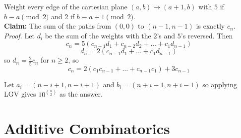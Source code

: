 \documentclass[11pt]{scrartcl}
\theoremstyle{plain} %
\theoremstyle{definition}
\theoremstyle{remark}
\theoremstyle{empty}
\theoremstyle{empty}
\theoremstyle{empty}
\theoremstyle{empty}
\theoremstyle{empty}
\theoremstyle{empty}
\theoremstyle{empty}
\theoremstyle{empty}
\begin{document}
\begin{solution}[Solution 1]
  Weight every edge of the cartesian plane $(a,b) \to (a+1, b)$ with $5$ if $b \equiv a\pmod 2$ and $2$ if $b \equiv a+1 \pmod 2$. 
  \\
  \textbf{Claim: }The sum of the paths from $(0,0)$ to $(n-1, n-1)$ is exactly $c_n$. 
  \\ \textit{Proof. }Let $d_i$ be the sum of the weights with the $2$'s and $5$'s reversed. Then \[c_n = 5(c_{n-1}d_1 + c_{n-2}d_2 + \ldots + c_{1}d_{n-1})\] \[d_n = 2(c_{n-1}d_1 + \ldots + c_1d_{n-1})\] so $d_n = \frac{2}{5}c_n$ for $n\ge 2$, so \[c_n = 2(c_1c_{n-1} + \ldots + c_{n-1}c_1) + 3c_{n-1}\] 

  Let $a_i = (n-i+1, n-i+1)$ and $b_i = (n+i-1, n+i-1)$ so applying LGV gives $10^{n \choose 2}$ as the answer. 
\end{solution}

\begin{solution}[Solution 2]
  
\end{solution}

\section{Additive Combinatorics}
\end{document}
